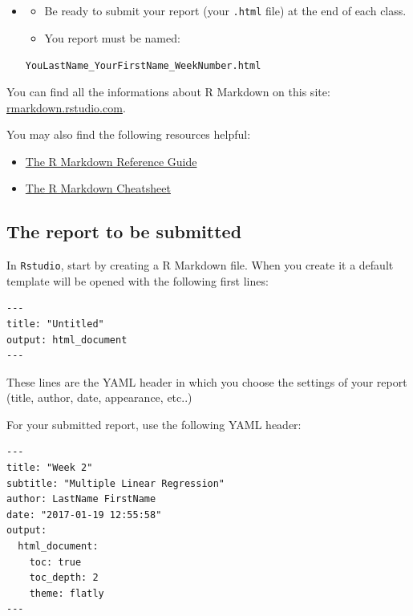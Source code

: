 \documentclass[]{book}
\providecommand{\tightlist}{%
  \setlength{\itemsep}{0pt}\setlength{\parskip}{0pt}}
\newenvironment{rmdblock}[1]
  {\begin{shaded*}
  \begin{itemize}
  \renewcommand{\labelitemi}{
    \raisebox{-.7\height}[0pt][0pt]{
      {\setkeys{Gin}{width=2em,keepaspectratio}\texttt{[image: img/icons/\#1]}}
    }
  }
  \item
  }
  {
  \end{itemize}
  \end{shaded*}
  }
\newenvironment{rmdcaution}
  {\begin{rmdblock}{caution}}
  {\end{rmdblock}}
\begin{document}
\begin{rmdcaution}
\begin{itemize}
\item
  Be ready to submit your report (your \texttt{.html} file) at the end
  of each class.
\item
  You report must be named:
\end{itemize}

\texttt{YouLastName\_YourFirstName\_WeekNumber.html}
\end{rmdcaution}

You can find all the informations about R Markdown on this site:
\href{http://rmarkdown.rstudio.com/lesson-1.html}{rmarkdown.rstudio.com}.

You may also find the following resources helpful:

\begin{itemize}
\tightlist
\item
  \href{https://www.rstudio.com/wp-content/uploads/2015/03/rmarkdown-reference.pdf}{The
  R Markdown Reference Guide}
\item
  \href{https://www.rstudio.com/wp-content/uploads/2016/03/rmarkdown-cheatsheet-2.0.pdf}{The
  R Markdown Cheatsheet}
\end{itemize}

\subsection*{The report to be
submitted}\label{the-report-to-be-submitted}

In \texttt{Rstudio}, start by creating a R Markdown file. When you
create it a default template will be opened with the following first
lines:

\begin{verbatim}
---
title: "Untitled"
output: html_document
---
\end{verbatim}

These lines are the YAML header in which you choose the settings of your
report (title, author, date, appearance, etc..)

For your submitted report, use the following YAML header:

\begin{verbatim}
---
title: "Week 2"
subtitle: "Multiple Linear Regression"
author: LastName FirstName
date: "2017-01-19 12:55:58"
output:
  html_document:
    toc: true
    toc_depth: 2
    theme: flatly
---
\end{verbatim}
\end{document}
